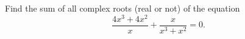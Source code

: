 Find the sum of all complex roots (real or not) of the equation
\[\dfrac{4x^3+4x^2}{x}+\dfrac{x}{x^3+x^2}=0.\]
